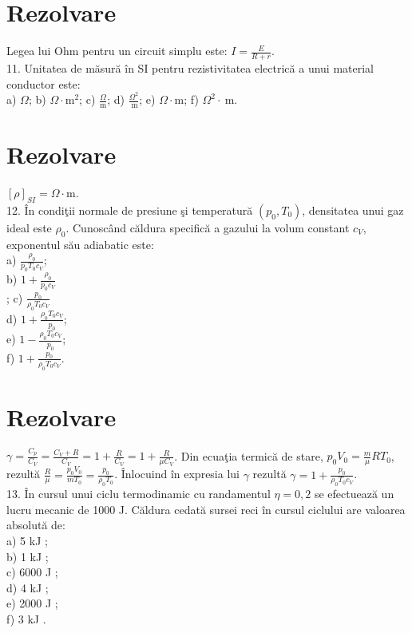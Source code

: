 \section*{Rezolvare}
Legea lui Ohm pentru un circuit simplu este: $I=\frac{E}{R+r}$.\\
11. Unitatea de măsură în SI pentru rezistivitatea electrică a unui material conductor este:\\
a) $\Omega$; b) $\Omega \cdot \mathrm{m}^{2}$; c) $\frac{\Omega}{\mathrm{m}}$; d) $\frac{\Omega^{2}}{\mathrm{~m}}$; e) $\Omega \cdot \mathrm{m}$; f) $\Omega^{2} \cdot \mathrm{~m}$.

\section*{Rezolvare}
$[\rho]_{S I}=\Omega \cdot \mathrm{m}$.\\
12. În condiţii normale de presiune şi temperatură $\left(p_{0}, T_{0}\right)$, densitatea unui gaz ideal este $\rho_{0}$. Cunoscând căldura specifică a gazului la volum constant $c_{V}$, exponentul său adiabatic este:\\
a) $\frac{\rho_{0}}{p_{0} T_{0} c_{V}}$;\\
b) $1+\frac{\rho_{0}}{p_{0} c_{V}}$\\
; c) $\frac{p_{0}}{\rho_{0} T_{0} c_{V}}$\\
d) $1+\frac{\rho_{0} T_{0} c_{V}}{p_{0}}$;\\
e) $1-\frac{\rho_{0} T_{0} c_{V}}{p_{0}}$;\\
f) $1+\frac{p_{0}}{\rho_{0} T_{0} c_{V}}$.

\section*{Rezolvare}
$\gamma=\frac{C_{p}}{C_{V}}=\frac{C_{V}+R}{C_{V}}=1+\frac{R}{C_{V}}=1+\frac{R}{\mu C_{V}}$. Din ecuaţia termică de stare, $p_{0} V_{0}=\frac{m}{\mu} R T_{0}$, rezultă $\frac{R}{\mu}=\frac{p_{0} V_{0}}{m T_{0}}=\frac{p_{0}}{\rho_{0} T_{0}}$. Înlocuind în expresia lui $\gamma$ rezultă $\gamma=1+\frac{p_{0}}{\rho_{0} T_{0} c_{V}}$.\\
13. În cursul unui ciclu termodinamic cu randamentul $\eta=0,2$ se efectuează un lucru mecanic de 1000 J. Căldura cedată sursei reci în cursul ciclului are valoarea absolută de:\\
a) 5 kJ ;\\
b) 1 kJ ;\\
c) 6000 J ;\\
d) 4 kJ ;\\
e) 2000 J ;\\
f) 3 kJ .

